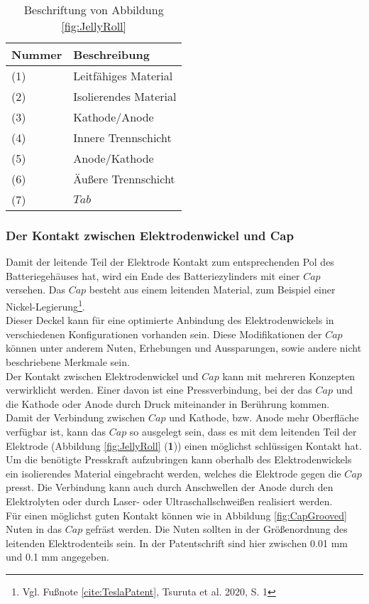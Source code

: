 \begin{table}[h!]
	\caption{Beschriftung von Abbildung \ref{fig:JellyRoll}}
	\label{tab:BeschriftungJellyRoll}
	\vspace{0.2cm}	
	\begin{tabularx}{\textwidth}{ |X|X|  }
		\toprule[1.5pt]
		\textbf{Nummer} & \textbf{Beschreibung} \\
		\hline\hline
		(1) & Leitfähiges Material \\
		\hline
		(2) & Isolierendes Material\\
		\hline
		(3) & Kathode/Anode\\
		\hline
		(4) & Innere Trennschicht\\
		\hline
		(5) & Anode/Kathode\\
		\hline
		(6) & Äußere Trennschicht\\
		\hline
		(7) & $Tab$\\
		\bottomrule[1.5pt]
	\end{tabularx}		
\end{table}

\subsubsection*{Der Kontakt zwischen Elektrodenwickel und Cap}\label{subsub:JellyrollCapContact}

Damit der leitende Teil der Elektrode Kontakt zum entsprechenden Pol des Batteriegehäuses hat, wird ein Ende des Batteriezylinders mit einer $Cap$ versehen. Das $Cap$ besteht aus einem leitenden Material, zum Beispiel einer Nickel-Legierung\footnote{Vgl. Fußnote \ref{cite:TeslaPatent}, Tsuruta et al. 2020, S. 1}.\\
Dieser Deckel kann für eine optimierte Anbindung des Elektrodenwickels in verschiedenen Konfigurationen vorhanden sein. Diese Modifikationen der $Cap$ können unter anderem Nuten, Erhebungen und Aussparungen, sowie andere nicht beschriebene Merkmale sein.\\
Der Kontakt zwischen Elektrodenwickel und $Cap$ kann mit mehreren Konzepten verwirklicht werden. Einer davon ist eine Pressverbindung, bei der das $Cap$ und die Kathode oder Anode durch Druck miteinander in Berührung kommen.\\
Damit der Verbindung zwischen $Cap$ und Kathode, bzw. Anode mehr Oberfläche verfügbar ist, kann das $Cap$ so ausgelegt sein, dass es mit dem leitenden Teil der Elektrode (Abbildung \ref{fig:JellyRoll} (\textbf{1})) einen möglichst schlüssigen Kontakt hat. Um die benötigte Presskraft aufzubringen kann oberhalb des Elektrodenwickels ein isolierendes Material eingebracht werden, welches die Elektrode gegen die $Cap$ presst. Die Verbindung kann auch durch Anschwellen der Anode durch den Elektrolyten oder durch Laser- oder Ultraschallschweißen realisiert werden.\\
Für einen möglichst guten Kontakt können wie in Abbildung \ref{fig:CapGrooved} Nuten in das $Cap$ gefräst werden. Die Nuten sollten in der Größenordnung des leitenden Elektrodenteils sein. In der Patentschrift sind hier zwischen 0.01 mm und 0.1 mm angegeben.\\

